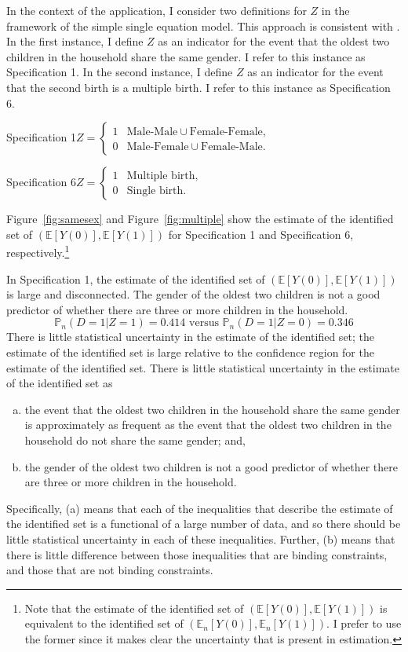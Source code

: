 \documentclass[12pt,a4paper,twoside]{article}
\numberwithin{equation}{section}
\begin{document}
In the context of the application, I consider two definitions for $Z$ in the framework of the simple single equation model. This approach is consistent with \cite{cr13}. In the first instance, I define $Z$ as an indicator for the event that the oldest two children in the household share the same gender. I refer to this instance as Specification 1. In the second instance, I define $Z$ as an indicator for the event that the second birth is a multiple birth. I refer to this instance as Specification 6.
 
\noindent Specification 1\hspace{10pt}$Z=\begin{cases}
1 &\text{Male-Male}\cup\text{Female-Female},\\
0 &\text{Male-Female}\cup\text{Female-Male}.
\end{cases}$

\noindent Specification 6\hspace{10pt}$Z=\begin{cases}
1 &\text{Multiple birth},\\
0 &\text{Single birth}.
\end{cases}$

\noindent Figure~\ref{fig:samesex} and Figure~\ref{fig:multiple} show the estimate of the identified set of $(\mathbb{E}[Y(0)],\mathbb{E}[Y(1)])$ for Specification 1 and Specification 6, respectively.\footnote{Note that the estimate of the identified set of $(\mathbb{E}[Y(0)],\mathbb{E}[Y(1)])$ is equivalent to the identified set of $(\mathbb{E}_n[Y(0)],\mathbb{E}_n[Y(1)])$. I prefer to use the former since it makes clear the uncertainty that is present in estimation.} 

In Specification 1, the estimate of the identified set of $(\mathbb{E}[Y(0)],\mathbb{E}[Y(1)])$ is large and disconnected. The gender of the oldest two children is not a good predictor of whether there are three or more children in the household. 
\[\mathbb{P}_n(D=1|Z=1)=0.414\text{ versus }\mathbb{P}_n(D=1|Z=0)=0.346\]
There is little statistical uncertainty in the estimate of the identified set; the estimate of the identified set is large relative to the confidence region for the estimate of the identified set. There is little statistical uncertainty in the estimate of the identified set as
\begin{enumerate}[(a)]
\item the event that the oldest two children in the household share the same gender is approximately as frequent as the event that the oldest two children in the household do not share the same gender; and,
\item the gender of the oldest two children is not a good predictor of whether there are three or more children in the household.
\end{enumerate} 
Specifically, (a) means that each of the inequalities that describe the estimate of the identified set is a functional of a large number of data, and so there should be little statistical uncertainty in each of these inequalities. Further, (b) means that there is little difference between those inequalities that are binding constraints, and those that are not binding constraints. 
\end{document}
